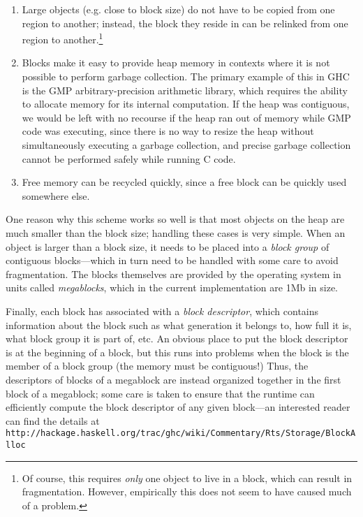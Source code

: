 \begin{enumerate}
    \item Large objects (e.g. close to block size) do not have to be copied from one region to
        another; instead, the block they reside in can be relinked from
        one region to another.\footnote{Of course, this requires \emph{only}
        one object to live in a block, which can result in fragmentation.
        However, empirically this does not seem to have caused much of a problem.}
    \item Blocks make it easy to provide heap memory in contexts where it is
        not possible to perform garbage collection.  The primary example of this
        in GHC is the GMP arbitrary-precision arithmetic library, which requires
        the ability to allocate memory for its internal computation.  If the heap
        was contiguous, we would be left with no recourse if the heap ran out
        of memory while GMP code was executing, since there is no way to resize
        the heap without simultaneously executing a garbage collection, and
        precise garbage collection cannot be performed safely while running C code.
    \item Free memory can be recycled quickly, since a free block can be quickly
        used somewhere else.
\end{enumerate}

One reason why this scheme works so well is that most objects on the
heap are much smaller than the block size; handling these cases is very
simple.  When an object is larger than a block size, it needs to be
placed into a \emph{block group} of contiguous blocks---which in turn
need to be handled with some care to avoid fragmentation.  The blocks
themselves are provided by the operating system in units called
\emph{megablocks}, which in the current implementation are 1Mb in size.

Finally, each block has associated with a \emph{block descriptor}, which
contains information about the block such as what generation it belongs to, how full it is, what block
group it is part of, etc.  An obvious place to put the block descriptor
is at the beginning of a block, but this runs into problems when the block
is the member of a block group (the memory must be contiguous!)
Thus, the descriptors of blocks of a megablock are instead organized together
in the first block of a megablock; some care is taken to ensure that the
runtime can efficiently compute the block descriptor of any given block---an
interested reader can find the details at \verb|http://hackage.haskell.org/trac/ghc/wiki/Commentary/Rts/Storage/BlockAlloc|
\XXX


